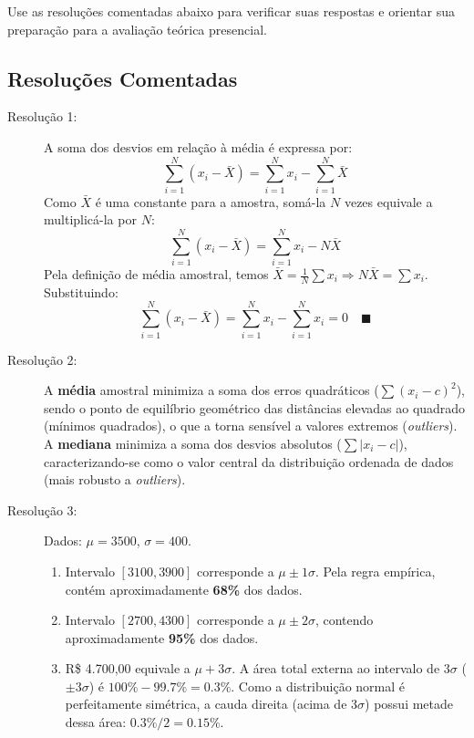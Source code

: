\documentclass[12pt]{article}
\begin{document}
\begin{tcolorbox}[colback=yellow!10!white,colframe=yellow!50!black,title=\textbf{Dica de Estudo}]
Use as resoluções comentadas abaixo para verificar suas respostas e orientar sua preparação para a avaliação teórica presencial.
\end{tcolorbox}

\subsection*{Resoluções Comentadas}

\begin{description}
    \item[Resolução 1:] A soma dos desvios em relação à média é expressa por:
    $$\sum_{i=1}^{N} (x_i - \bar{X}) = \sum_{i=1}^{N} x_i - \sum_{i=1}^{N} \bar{X}$$
    Como $\bar{X}$ é uma constante para a amostra, somá-la $N$ vezes equivale a multiplicá-la por $N$:
    $$\sum_{i=1}^{N} (x_i - \bar{X}) = \sum_{i=1}^{N} x_i - N\bar{X}$$
    Pela definição de média amostral, temos $\bar{X} = \frac{1}{N} \sum x_i \Rightarrow N\bar{X} = \sum x_i$. Substituindo:
    $$\sum_{i=1}^{N} (x_i - \bar{X}) = \sum_{i=1}^{N} x_i - \sum_{i=1}^{N} x_i = 0 \quad \blacksquare$$

    \item[Resolução 2:] A \textbf{média} amostral minimiza a soma dos erros quadráticos ($\sum (x_i - c)^2$), sendo o ponto de equilíbrio geométrico das distâncias elevadas ao quadrado (mínimos quadrados), o que a torna sensível a valores extremos (\textit{outliers}). A \textbf{mediana} minimiza a soma dos desvios absolutos ($\sum |x_i - c|$), caracterizando-se como o valor central da distribuição ordenada de dados (mais robusto a \textit{outliers}).

    \item[Resolução 3:] Dados: $\mu = 3500$, $\sigma = 400$.
    \begin{enumerate}[label=\alph*)]
        \item Intervalo $[3100, 3900]$ corresponde a $\mu \pm 1\sigma$. Pela regra empírica, contém aproximadamente \textbf{68\%} dos dados.
        \item Intervalo $[2700, 4300]$ corresponde a $\mu \pm 2\sigma$, contendo aproximadamente \textbf{95\%} dos dados.
        \item R\$ 4.700,00 equivale a $\mu + 3\sigma$. A área total externa ao intervalo de $3\sigma$ ($\pm 3\sigma$) é $100\% - 99.7\% = 0.3\%$. Como a distribuição normal é perfeitamente simétrica, a cauda direita (acima de $3\sigma$) possui metade dessa área: $0.3\% / 2 = \mathbf{0.15\%}$.
    \end{enumerate}


\end{description}
\end{document}
